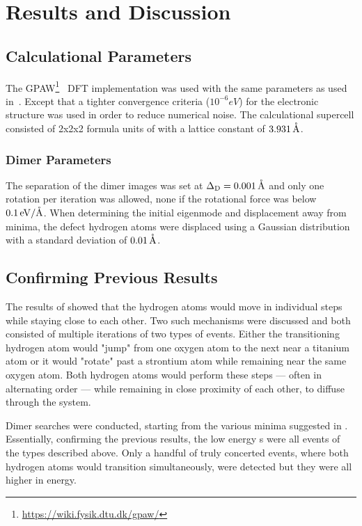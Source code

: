\section{Results and Discussion}
\label{sec:perovskites-results}

\subsection{Calculational Parameters}
The GPAW\footnote{\url{https://wiki.fysik.dtu.dk/gpaw/}}~\cite{gpaw-review-2010} DFT implementation was used with the same parameters as used in~\cite{double-defect-2011}.
Except that a tighter convergence criteria ($10^{-6} \unit{eV}$) for the electronic structure was used in order to reduce numerical noise.
The calculational supercell consisted of 2x2x2 formula units of  with a lattice constant of $3.931\, \mathrm{\mathring{\mathrm{A}}}$.

\subsubsection{Dimer Parameters}
The separation of the dimer images was set at $\Delta_\text{D} = 0.001\, \mathrm{\mathring{\mathrm{A}}}$ and only one rotation per iteration was allowed, none if the rotational force was below $0.1\, \mathrm{eV/\mathring{\mathrm{A}}}$.
When determining the initial eigenmode and displacement away from minima, the defect hydrogen atoms were displaced using a Gaussian distribution with a standard deviation of $0.01 \, \mathrm{\mathring{\mathrm{A}}}$.

\subsection{Confirming Previous Results }
The results of \cite{double-defect-2011} showed that the hydrogen atoms would move in individual steps while staying close to each other.
Two such mechanisms were discussed and both consisted of multiple iterations of two types of events.
Either the transitioning hydrogen atom would "jump" from one oxygen atom to the next near a titanium atom or it would "rotate" past a strontium atom while remaining near the same oxygen atom.
Both hydrogen atoms would perform these steps --- often in alternating order --- while remaining in close proximity of each other, to diffuse through the system.

Dimer  searches were conducted, starting from the various minima suggested in \cite{double-defect-2011}.
Essentially, confirming the previous results, the low energy s were all events of the types described above.
Only a handful of truly concerted events, where both hydrogen atoms would transition simultaneously, were detected but they were all higher in energy.

